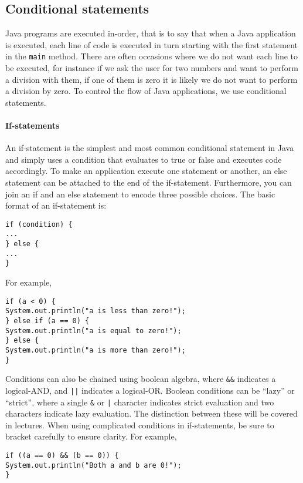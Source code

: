 \subsection{Conditional statements}

Java programs are executed in-order, that is to say that when a Java application is executed, each line of code is executed in turn starting with the first statement in the {\tt main} method. There are often occasions where we do not want each line to be executed, for instance if we ask the user for two numbers and want to perform a division with them, if one of them is zero it is likely we do not want to perform a division by zero. To control the flow of Java applications, we use conditional statements.

\paragraph{If-statements} An if-statement is the simplest and most common conditional statement in Java and simply uses a condition that evaluates to true or false and executes code accordingly. To make an application execute one statement or another, an else statement can be attached to the end of the if-statement. Furthermore, you can join an if and an else statement to encode three possible choices. The basic format of an if-statement is:

\begin{verbatim}
if (condition) {
...
} else {
...
}
\end{verbatim}

\noindent
For example,

\begin{verbatim}
if (a < 0) {
System.out.println("a is less than zero!");
} else if (a == 0) {
System.out.println("a is equal to zero!");
} else {
System.out.println("a is more than zero!");
}
\end{verbatim}

\noindent
Conditions can also be chained using boolean algebra, where {\tt \&\&} indicates a logical-AND, and {\tt ||} indicates a logical-OR. Boolean conditions can be ``lazy'' or ``strict'', where a single {\tt \&} or {\tt |} character indicates strict evaluation and two characters indicate lazy evaluation. The distinction between these will be covered in lectures. When using complicated conditions in if-statements, be sure to bracket carefully to ensure clarity. For example,

\begin{verbatim}
if ((a == 0) && (b == 0)) {
System.out.println("Both a and b are 0!");
}
\end{verbatim}

